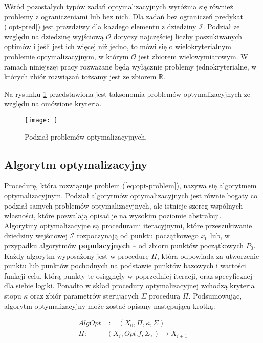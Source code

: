 Wśród pozostałych typów zadań optymalizacyjnych wyróżnia się również problemy z ograniczeniami lub bez nich. Dla zadań bez ograniczeń predykat (\ref{opt-pred}) jest prawdziwy dla każdego elementu z dziedziny $\mathcal{I}$. Podział ze względu na dziedzinę wyjściową $\mathcal{O}$ dotyczy najczęściej liczby poszukiwanych optimów i jeśli jest ich więcej niż jedno, to mówi się o wielokryterialnym problemie optymalizacyjnym, w którym $\mathcal{O}$ jest zbiorem wielowymiarowym. W ramach niniejszej pracy rozważane będą wyłącznie problemy jednokryterialne, w których zbiór rozwiązań tożsamy jest ze zbiorem $\mathbb{R}$.

Na rysunku \ref{fig:optim-taks} przedstawiona jest taksonomia problemów optymalizacyjnych ze względu na omówione kryteria. 

\begin{figure}
    \centering
    \texttt{[image: ]}
    \caption{Podział problemów optymalizacyjnych.}
    \label{fig:optim-taks}
\end{figure}


\subsection{Algorytm optymalizacyjny \label{subsec:optim-alg}}

Procedurę, która rozwiązuje problem (\ref{eq:opt-problem}), nazywa się algorytmem optymalizacyjnym. Podział algorytmów optymalizacyjnych jest równie bogaty co podział samych problemów optymalizacyjnych, ale istnieje szereg wspólnych własności, które pozwalają opisać je na wysokim poziomie abstrakcji. \\
Algorytmy optymalizacyjne są procedurami iteracyjnymi, które przeszukiwanie dziedziny wejściowej $\mathcal{I}$ rozpoczynają od punktu początkowego $x_0$ lub, w przypadku algorytmów \textbf{populacyjnych} -- od zbioru punktów początkowych $P_0$. Każdy algorytm wyposażony jest w procedurę $\Pi$, która odpowiada za utworzenie punktu lub punktów pochodnych na podstawie punktów bazowych i wartości funkcji celu, którą punkty te osiągnęły w poprzedniej iteracji, oraz specyficznej dla siebie logiki. Ponadto w skład procedury optymalizacyjnej wchodzą kryteria stopu $\kappa$ oraz zbiór parametrów sterujących $\Sigma$ procedurą $\Pi$. Podsumowując, algorytm optymalizacyjny może zostać opisany następującą krotką:

\begin{align*}
 AlgOpt &:= \left( X_0, \Pi, \kappa, \Sigma \right) \\
 \Pi\colon\; & \left(X_i, Opt.f, \Sigma, \right) \rightarrow X_{i+1}
\end{align*}
    



